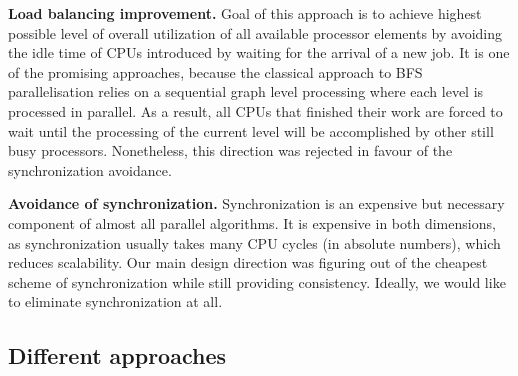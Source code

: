 \documentclass[letterpaper]{article}
\begin{document}
			\textbf{Load balancing improvement.} 
			Goal of this approach is to achieve highest possible level of overall utilization of all available processor elements by avoiding the idle time of CPUs introduced by waiting for the arrival of a new job.
			It is one of the promising approaches, because the classical approach to BFS parallelisation relies on a sequential graph level processing where each level is processed in parallel.
			As a result, all CPUs that finished their work are forced to wait until the processing of the current level will be accomplished by other still busy processors.
			Nonetheless, this direction was rejected in favour of the synchronization avoidance. 
			
			\textbf{Avoidance of synchronization.}
			Synchronization is an expensive but necessary component of almost all parallel algorithms.
			It is expensive in both dimensions, as synchronization usually takes many CPU cycles (in absolute numbers), which reduces scalability. %
			Our main design direction was figuring out of the cheapest scheme of synchronization while still providing consistency.
			Ideally, we would like to eliminate synchronization at all.
			
			

	
		
		\subsection{Different approaches}\label{sec:approaches}
		
		
\end{document}
